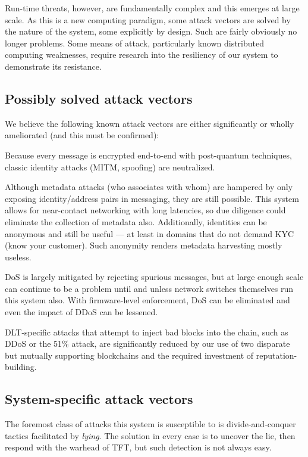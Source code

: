 Run-time threats, however, are fundamentally complex and this emerges at large scale.
As this is a new computing paradigm, some attack vectors are solved by the nature of the system, some explicitly by design.
Such are fairly obviously no longer problems.
Some means of attack, particularly known distributed computing weaknesses, require research into the resiliency of our system to demonstrate its resistance.

\subsection{Possibly solved attack vectors}\label{subsec:possibly-solved}

We believe the following known attack vectors are either significantly or wholly ameliorated (and this must be confirmed):

Because every message is encrypted end-to-end with post-quantum techniques, classic identity attacks (MITM, spoofing) are neutralized.

Although metadata attacks (who associates with whom) are hampered by only exposing identity/address pairs in messaging, they are still possible.
This system allows for near-contact networking with long latencies, so due diligence could eliminate the collection of metadata also.
Additionally, identities can be anonymous and still be useful --- at least in domains that do not demand KYC (know your customer).
Such anonymity renders metadata harvesting mostly useless.

DoS is largely mitigated by rejecting spurious messages, but at large enough scale can continue to be a problem until and unless network switches themselves run this system also.
With firmware-level enforcement, DoS can be eliminated and even the impact of DDoS can be lessened.

DLT-specific attacks that attempt to inject bad blocks into the chain, such as DDoS or the 51\% attack, are significantly reduced by our use of two disparate but mutually supporting blockchains and the required investment of reputation-building.


\subsection{System-specific attack vectors}\label{subsec:system-specific}

The foremost class of attacks this system is susceptible to is divide-and-conquer tactics facilitated by \textit{lying}.
The solution in every case is to uncover the lie, then respond with the warhead of TFT, but such detection is not always easy.

